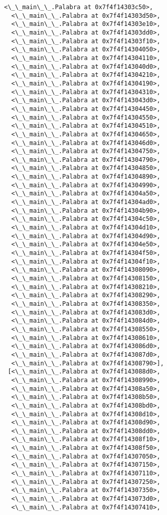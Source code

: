 \documentclass[12pt,a4paper,table]{article}
\begin{document}
\begin{tcolorbox}[breakable, size=fbox, boxrule=.5pt, pad at break*=1mm, opacityfill=0]
\begin{Verbatim}[commandchars=\\\{\}]
  <\_\_main\_\_.Palabra at 0x7f4f14303c50>,
  <\_\_main\_\_.Palabra at 0x7f4f14303d50>,
  <\_\_main\_\_.Palabra at 0x7f4f14303e10>,
  <\_\_main\_\_.Palabra at 0x7f4f14303dd0>,
  <\_\_main\_\_.Palabra at 0x7f4f14303f10>,
  <\_\_main\_\_.Palabra at 0x7f4f14304050>,
  <\_\_main\_\_.Palabra at 0x7f4f14304110>,
  <\_\_main\_\_.Palabra at 0x7f4f143040d0>,
  <\_\_main\_\_.Palabra at 0x7f4f14304210>,
  <\_\_main\_\_.Palabra at 0x7f4f14304190>,
  <\_\_main\_\_.Palabra at 0x7f4f14304310>,
  <\_\_main\_\_.Palabra at 0x7f4f143043d0>,
  <\_\_main\_\_.Palabra at 0x7f4f14304450>,
  <\_\_main\_\_.Palabra at 0x7f4f14304550>,
  <\_\_main\_\_.Palabra at 0x7f4f14304510>,
  <\_\_main\_\_.Palabra at 0x7f4f14304650>,
  <\_\_main\_\_.Palabra at 0x7f4f143046d0>,
  <\_\_main\_\_.Palabra at 0x7f4f14304750>,
  <\_\_main\_\_.Palabra at 0x7f4f14304790>,
  <\_\_main\_\_.Palabra at 0x7f4f14304850>,
  <\_\_main\_\_.Palabra at 0x7f4f14304890>,
  <\_\_main\_\_.Palabra at 0x7f4f14304990>,
  <\_\_main\_\_.Palabra at 0x7f4f14304a50>,
  <\_\_main\_\_.Palabra at 0x7f4f14304ad0>,
  <\_\_main\_\_.Palabra at 0x7f4f14304b90>,
  <\_\_main\_\_.Palabra at 0x7f4f14304c50>,
  <\_\_main\_\_.Palabra at 0x7f4f14304d10>,
  <\_\_main\_\_.Palabra at 0x7f4f14304d90>,
  <\_\_main\_\_.Palabra at 0x7f4f14304e50>,
  <\_\_main\_\_.Palabra at 0x7f4f14304f50>,
  <\_\_main\_\_.Palabra at 0x7f4f14304f10>,
  <\_\_main\_\_.Palabra at 0x7f4f14308090>,
  <\_\_main\_\_.Palabra at 0x7f4f14308150>,
  <\_\_main\_\_.Palabra at 0x7f4f14308210>,
  <\_\_main\_\_.Palabra at 0x7f4f14308290>,
  <\_\_main\_\_.Palabra at 0x7f4f14308350>,
  <\_\_main\_\_.Palabra at 0x7f4f143083d0>,
  <\_\_main\_\_.Palabra at 0x7f4f143084d0>,
  <\_\_main\_\_.Palabra at 0x7f4f14308550>,
  <\_\_main\_\_.Palabra at 0x7f4f14308610>,
  <\_\_main\_\_.Palabra at 0x7f4f143086d0>,
  <\_\_main\_\_.Palabra at 0x7f4f143087d0>,
  <\_\_main\_\_.Palabra at 0x7f4f14308790>],
 [<\_\_main\_\_.Palabra at 0x7f4f143088d0>,
  <\_\_main\_\_.Palabra at 0x7f4f14308990>,
  <\_\_main\_\_.Palabra at 0x7f4f14308a50>,
  <\_\_main\_\_.Palabra at 0x7f4f14308b50>,
  <\_\_main\_\_.Palabra at 0x7f4f14308bd0>,
  <\_\_main\_\_.Palabra at 0x7f4f14308d10>,
  <\_\_main\_\_.Palabra at 0x7f4f14308d90>,
  <\_\_main\_\_.Palabra at 0x7f4f14308dd0>,
  <\_\_main\_\_.Palabra at 0x7f4f14308f10>,
  <\_\_main\_\_.Palabra at 0x7f4f14308f50>,
  <\_\_main\_\_.Palabra at 0x7f4f14307050>,
  <\_\_main\_\_.Palabra at 0x7f4f14307150>,
  <\_\_main\_\_.Palabra at 0x7f4f14307110>,
  <\_\_main\_\_.Palabra at 0x7f4f14307250>,
  <\_\_main\_\_.Palabra at 0x7f4f14307350>,
  <\_\_main\_\_.Palabra at 0x7f4f143073d0>,
  <\_\_main\_\_.Palabra at 0x7f4f14307410>,

\end{Verbatim}
\end{tcolorbox}
\end{document}
